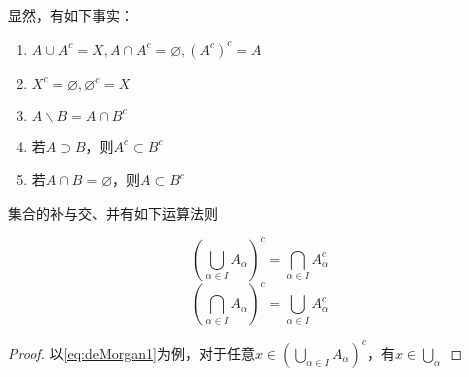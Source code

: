 显然，有如下事实：

\begin{enumerate}
    \item $A\cup A^c = X, A\cap A^c = \varnothing, (A^c)^c = A$
    \item $X^c = \varnothing,\varnothing^c = X$
    \item $A\backslash B = A\cap B^c$
    \item 若$A\supset B$，则$A^c\subset B^c$
    \item 若$A\cap B = \varnothing$，则$A\subset B^c$
\end{enumerate}

集合的补与交、并有如下运算法则

\begin{theorem}[De.Morgan法则]
    \begin{equation}
        \label{eq:deMorgan1}
        \left(\bigcup_{\alpha \in I} A_\alpha\right)^c = \bigcap_{\alpha \in I} A_\alpha^c
    \end{equation}
    \begin{equation}
        \label{eq:deMorgan2}
        \left(\bigcap_{\alpha \in I} A_\alpha\right)^c = \bigcup_{\alpha \in I} A_\alpha^c
    \end{equation}
\end{theorem}

\begin{proof}
    以\eqref{eq:deMorgan1}为例，对于任意$\displaystyle x\in \left(\bigcup_{\alpha \in I} A_\alpha\right)^c$，有$x\in \bigcup_{\alpha}$
\end{proof}